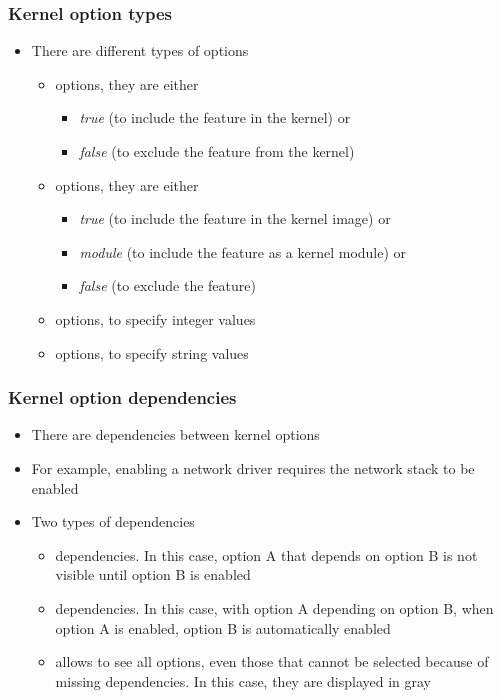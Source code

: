 \begin{frame}
  \frametitle{Kernel option types}
  \begin{itemize}
  \item There are different types of options
    \begin{itemize}
    \item {} options, they are either
      \begin{itemize}
      \item {\em true} (to include the feature in the kernel) or
      \item {\em false} (to exclude the feature from the kernel)
      \end{itemize}
    \item {} options, they are either
      \begin{itemize}
      \item {\em true} (to include the feature in the kernel image) or
      \item {\em module} (to include the feature as a kernel module) or
      \item {\em false} (to exclude the feature)
      \end{itemize}
    \item {} options, to specify integer values
    \item {} options, to specify string values
    \end{itemize}
  \end{itemize}
\end{frame}

\begin{frame}
  \frametitle{Kernel option dependencies}
  \begin{itemize}
  \item There are dependencies between kernel options
  \item For example, enabling a network driver requires the network
    stack to be enabled
  \item Two types of dependencies
    \begin{itemize}
    \item {} dependencies. In this case, option A that
      depends on option B is not visible until option B is enabled
    \item {} dependencies. In this case, with option A
      depending on option B, when option A is enabled, option B is
      automatically enabled
    \item {} allows to see all options, even those
      that cannot be selected because of missing dependencies. In this
      case, they are displayed in gray
    \end{itemize}
  \end{itemize}
\end{frame}


